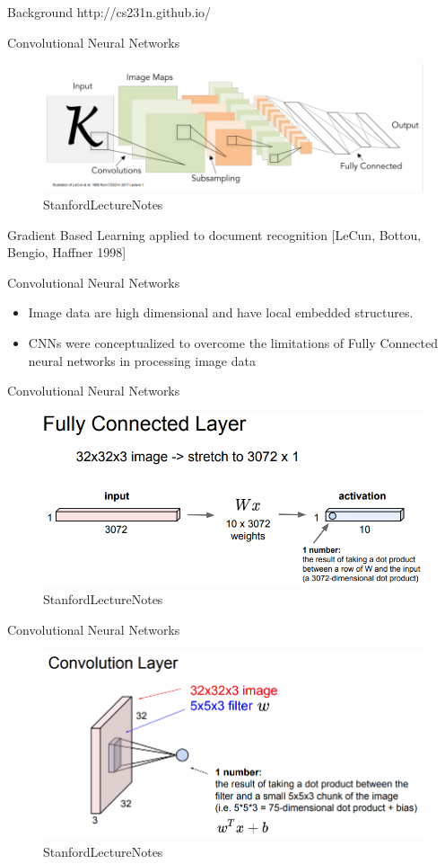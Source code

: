 \documentclass[11pt]{article}
\makeatletter
\def\maxwidth{\ifdim\Gin@nat@width>\linewidth\linewidth
    \else\Gin@nat@width\fi}
\let\Oldincludegraphics\includegraphics
\renewcommand{\includegraphics}[1]{\Oldincludegraphics[width=.8\maxwidth]{#1}}
\makeatother
\begin{document}
Background http://cs231n.github.io/

    Convolutional Neural Networks

\begin{figure}
\centering
\includegraphics{pres_imgs/CNN_template.png}
\caption{StanfordLectureNotes}
\end{figure}

Gradient Based Learning applied to document recognition {[}LeCun,
Bottou, Bengio, Haffner 1998{]}

    Convolutional Neural Networks

\begin{itemize}
\item
  Image data are high dimensional and have local embedded structures.
\item
  CNNs were conceptualized to overcome the limitations of Fully
  Connected neural networks in processing image data
\end{itemize}

    Convolutional Neural Networks

\begin{figure}
\centering
\includegraphics{pres_imgs/fc_layer.png}
\caption{StanfordLectureNotes}
\end{figure}

    Convolutional Neural Networks

\begin{figure}
\centering
\includegraphics{pres_imgs/conv_layer_1.png}
\caption{StanfordLectureNotes}
\end{figure}
\end{document}
